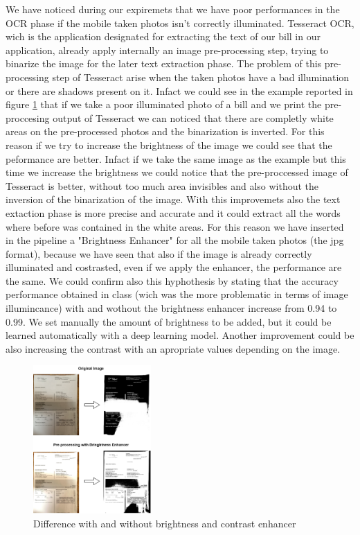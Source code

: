 \documentclass[10pt,twocolumn,letterpaper]{article}
\begin{document}
We have noticed during our expiremets that we have poor performances
in the OCR phase if the mobile taken photos isn't correctly
illuminated. Tesseract OCR, wich is the application designated for
extracting the text of our bill in our application, already apply
internally an image pre-processing step, trying to binarize the image
for the later text extraction phase. The problem of this
pre-processing step of Tesseract arise when the taken photos have a
bad illumination or there are shadows present on it. Infact we could
see in the example reported in figure
\ref{bright-constrast-experiment} that if we take a poor illuminated
photo of a bill and we print the pre-proccesing output of Tesseract we
can noticed that there are completly white areas on the pre-processed
photos and the binarization is inverted. For this reason if we try to
increase the brightness of the image we could see that the peformance
are better. Infact if we take the same image as the example but this
time we increase the brightness we could notice that the
pre-proccessed image of Tesseract is better, without too much area
invisibles and also without the inversion of the binarization of the
image. With this improvemets also the text extaction phase is more
precise and accurate and it could extract all the words where before
was contained in the white areas. For this reason we have inserted in
the pipeline a "Brightness Enhancer" for all the mobile taken photos
(the jpg format), because we have seen that also if the image is
already correctly illuminated and costrasted, even if we apply the
enhancer, the performance are the same. We could confirm also this
hyphothesis by stating that the accuracy performance obtained in class
(wich was the more problematic in terms of image illumincance) with
and wothout the brightness enhancer increase from 0.94 to 0.99. We set
manually the amount of brightness to be added, but it could be learned
automatically with a deep learning model. Another improvement could be
also increasing the contrast with an apropriate values depending on
the image.

\begin{figure}[h]
  \centering
  \includegraphics[width=0.4\textwidth]{images/bright-contrast-experiment.png}
  \caption{Difference with and without brightness and contrast enhancer}
  \label{bright-constrast-experiment}
\end{figure}
\end{document}
